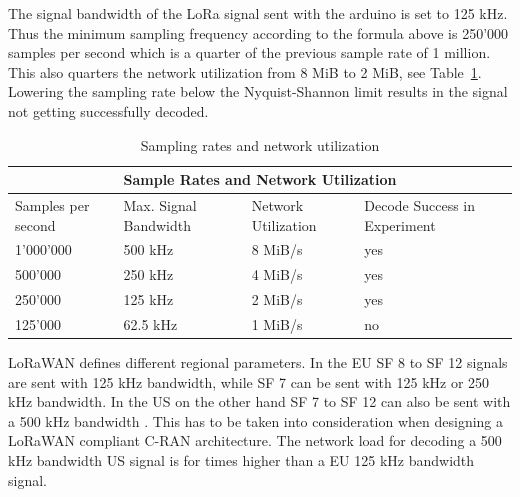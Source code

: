 The signal bandwidth of the LoRa signal sent with the arduino is set to 125 kHz. Thus the minimum sampling frequency according to the formula above
is 250'000 samples per second which is a quarter of the previous sample rate of 1 million. This also quarters the network utilization from 8 MiB to 2 MiB, see Table~\ref{tabl:samprates}.
Lowering the sampling rate below the Nyquist-Shannon limit results in the signal not getting successfully decoded.

\begin{table}[h]
    \centering
    \begin{tabular}{ |p{3cm}|p{3cm}|p{3cm}|p{3cm}| }
        \hline
        \multicolumn{4}{|c|}{Sample Rates and Network Utilization} \\
        \hline
        Samples per second & Max. Signal Bandwidth& Network Utilization & Decode Success in Experiment\\
        \hline
        1'000'000  &500 kHz & 8 MiB/s    &yes\\
        500'000  &250 kHz & 4 MiB/s    &yes\\
        250'000&  125 kHz&  2 MiB/s  & yes\\
        125'000 & 62.5 kHz & 1 MiB/s & no\\
        \hline
       \end{tabular}
\caption{Sampling rates and network utilization}
\label{tabl:samprates}
\end{table}

LoRaWAN defines different regional parameters. In the EU SF 8 to SF 12 signals are sent with 125 kHz bandwidth, while SF 7
can be sent with 125 kHz or 250 kHz bandwidth. In the US on the other hand SF 7 to SF 12 can also be sent with
a 500 kHz bandwidth \cite{lora_wan_reg_params}.
This has to be taken into consideration when designing a LoRaWAN compliant C-RAN architecture.
The network load for decoding a 500 kHz bandwidth US signal is for times higher than a EU 125 kHz bandwidth signal.

